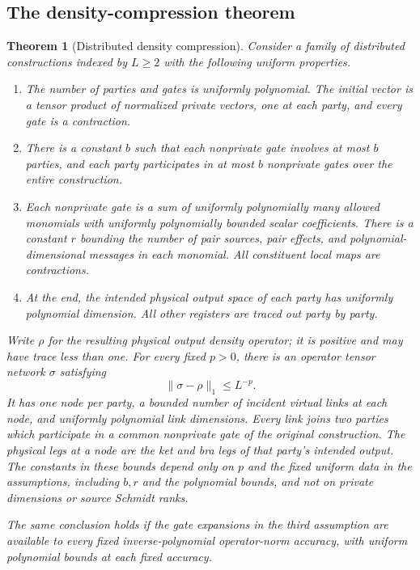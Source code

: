 \documentclass[11pt]{article}
\numberwithin{equation}{section}
\newtheorem{theorem}{Theorem}[section]
\theoremstyle{definition}
\theoremstyle{remark}
\begin{document}
\subsection{The density-compression theorem}

\begin{theorem}[Distributed density compression]
\label{thm:compression}
Consider a family of distributed constructions indexed by $L\ge2$ with
the following uniform properties.
\begin{enumerate}
\item The number of parties and gates is uniformly polynomial.  The
initial vector is a tensor product of normalized private vectors, one
at each party, and every gate is a contraction.
\item There is a constant $b$ such that each nonprivate gate involves at
most $b$ parties, and each party participates in at most $b$ nonprivate
gates over the entire construction.
\item Each nonprivate gate is a sum of uniformly polynomially many
allowed monomials with uniformly polynomially bounded scalar
coefficients.  There is a constant $r$ bounding the number of pair
sources, pair effects, and polynomial-dimensional messages in each
monomial.  All constituent local maps are contractions.
\item At the end, the intended physical output space of each party has
uniformly polynomial dimension.  All other registers are traced out
party by party.
\end{enumerate}
Write $\rho$ for the resulting physical output density operator; it is
positive and may have trace less than one.  For every fixed $p>0$, there
is an operator tensor network $\sigma$ satisfying
\[
 \lVert \sigma-\rho\rVert_1\le L^{-p}.
\]
It has one node per party, a bounded number of incident virtual links at
each node, and uniformly polynomial link dimensions.  Every link joins
two parties which participate in a common nonprivate gate of the
original construction.  The physical legs at a node are the ket and bra
legs of that party's intended output.
The constants in these bounds depend only on $p$ and the fixed uniform
data in the assumptions, including $b,r$ and the polynomial bounds,
and not on private dimensions or source Schmidt ranks.

The same conclusion holds if the gate expansions in the third
assumption are available to every fixed inverse-polynomial
operator-norm accuracy, with uniform polynomial bounds at each fixed
accuracy.
\end{theorem}
\end{document}
